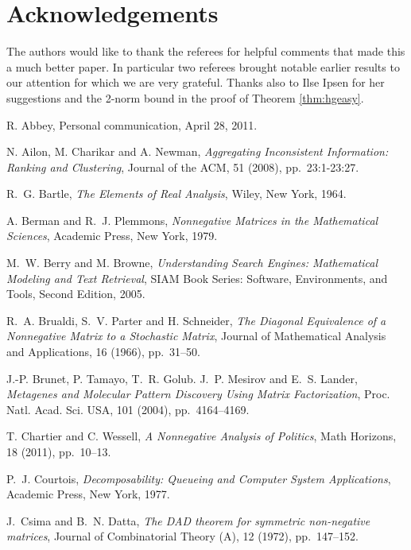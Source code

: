 \documentclass[final]{siamltex}
\begin{document}
\section{Acknowledgements} The authors would like to thank the referees for helpful comments that made this a much better paper. In particular two referees brought notable earlier results to our attention for which we are very grateful. Thanks also to Ilse Ipsen for her suggestions and the 2-norm bound in the proof of Theorem \ref{thm:hgeasy}.

\begin{thebibliography}{99}

 {\sc R. Abbey}, {Personal communication}, April 28, 2011.

 {\sc N. Ailon, M. Charikar and A. Newman}, {\em Aggregating Inconsistent Information: Ranking and Clustering}, Journal of the ACM, 51 (2008), pp.~23:1-23:27.

 {\sc R.~G. Bartle}, {\em The Elements of Real Analysis}, Wiley, New York, 1964.

 {\sc A. Berman and R.~J. Plemmons}, {\em Nonnegative Matrices in the Mathematical Sciences}, Academic Press, New York, 1979.

 {\sc M.~W. Berry and M. Browne}, {\em Understanding Search Engines: Mathematical Modeling and Text Retrieval}, SIAM Book Series: Software, Environments, and Tools, Second Edition, 2005.

 {\sc R.~A. Brualdi, S.~V. Parter and H. Schneider}, {\em The Diagonal Equivalence of a Nonnegative Matrix to a Stochastic Matrix}, Journal of Mathematical Analysis and Applications, 16 (1966), pp.~31--50.

 {\sc J.-P. Brunet, P. Tamayo, T.~R. Golub. J.~P. Mesirov and E.~S. Lander}, {\em Metagenes and Molecular Pattern Discovery Using Matrix Factorization}, Proc. Natl. Acad. Sci. USA, 101 (2004), pp.~4164--4169.

 {\sc T. Chartier and C. Wessell}, {\em A Nonnegative Analysis of Politics}, Math Horizons, 18 (2011), pp.~10--13.

 {\sc P.~J. Courtois}, {\em Decomposability: Queueing and Computer System Applications}, Academic Press, New York, 1977.

 {\sc J.~Csima and B.~N. Datta}, {\em The DAD theorem for symmetric non-negative matrices}, Journal of Combinatorial Theory (A), 12 (1972), pp.~147--152.


\end{thebibliography}
\end{document}
